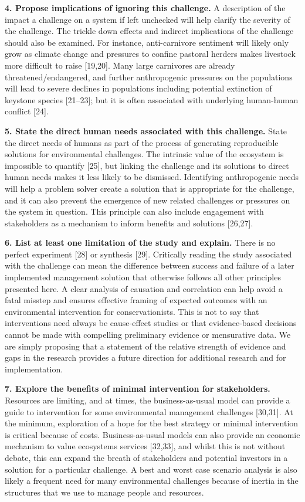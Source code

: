 \documentclass[10pt,letterpaper]{article}
\begin{document}
\textbf{4. Propose implications of ignoring this challenge.} A
description of the impact a challenge on a system if left unchecked will
help clarify the severity of the challenge. The trickle down effects and
indirect implications of the challenge should also be examined. For
instance, anti-carnivore sentiment will likely only grow as climate
change and pressures to confine pastoral herders makes livestock more
difficult to raise {[}19,20{]}. Many large carnivores are already
threatened/endangered, and further anthropogenic pressures on the
populations will lead to severe declines in populations including
potential extinction of keystone species {[}21--23{]}; but it is often
associated with underlying human-human conflict {[}24{]}.

\textbf{5. State the direct human needs associated with this challenge.}
State the direct needs of humans as part of the process of generating
reproducible solutions for environmental challenges. The intrinsic value
of the ecosystem is impossible to quantify {[}25{]}, but linking the
challenge and its solutions to direct human needs makes it less likely
to be dismissed. Identifying anthropogenic needs will help a problem
solver create a solution that is appropriate for the challenge, and it
can also prevent the emergence of new related challenges or pressures on
the system in question. This principle can also include engagement with
stakeholders as a mechanism to inform benefits and solutions
{[}26,27{]}.

\textbf{6. List at least one limitation of the study and explain.} There
is no perfect experiment {[}28{]} or synthesis {[}29{]}. Critically
reading the study associated with the challenge can mean the difference
between success and failure of a later implemented management solution
that otherwise follows all other principles presented here. A clear
analysis of causation and correlation can help avoid a fatal misstep and
ensures effective framing of expected outcomes with an environmental
intervention for conservationists. This is not to say that interventions
need always be cause-effect studies or that evidence-based decisions
cannot be made with compelling preliminary evidence or mensurative data.
We are simply proposing that a statement of the relative strength of
evidence and gaps in the research provides a future direction for
additional research and for implementation.

\textbf{7. Explore the benefits of minimal intervention for
stakeholders.} Resources are limiting, and at times, the
business-as-usual model can provide a guide to intervention for some
environmental management challenges {[}30,31{]}. At the minimum,
exploration of a hope for the best strategy or minimal intervention is
critical because of costs. Business-as-usual models can also provide an
economic mechanism to value ecosystems services {[}32,33{]}, and whilst
this is not without debate, this can expand the breath of stakeholders
and potential investors in a solution for a particular challenge. A best
and worst case scenario analysis is also likely a frequent need for many
environmental challenges because of inertia in the structures that we
use to manage people and resources.
\end{document}
